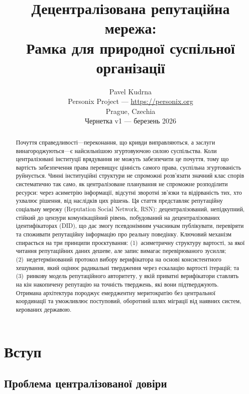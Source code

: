 \documentclass[11pt,a4paper,twocolumn]{article}
\title{\textbf{Децентралізована репутаційна мережа:\\Рамка для природної суспільної організації}}
\author{Pavel Kudrna\\Personix Project --- \url{https://personix.org}\\Prague, Czechia\\Чернетка v1 --- березень 2026}
\date{}
\begin{document}
\maketitle

\begin{abstract}
Почуття справедливості---переконання, що кривди виправляються, а заслуги винагороджуються---є найсильнішою згуртовуючою силою суспільства. Коли централізовані інституції врядування не можуть забезпечити це почуття, тому що вартість забезпечення права перевищує цінність самого права, суспільна згуртованість руйнується. Чинні інституційні структури не спроможні розв'язати значний клас спорів систематично так само, як централізоване планування не спроможне розподілити ресурси: через асиметрію інформації, відсутні зворотні зв'язки та відірваність тих, хто ухвалює рішення, від наслідків цих рішень. Ця стаття представляє репутаційну соціальну мережу (Reputation Social Network, RSN): децентралізований, непідкупний, стійкий до цензури комунікаційний рівень, побудований на децентралізованих ідентифікаторах (DID), що дає змогу псевдонімним учасникам публікувати, перевіряти та споживати репутаційну інформацію про реальну поведінку. Ключовий механізм спирається на три принципи проєктування: (1)~асиметричну структуру вартості, за якої читання репутаційних даних дешеве, але запис вимагає перевірюваного зусилля; (2)~недетермінований протокол вибору верифікатора на основі консистентного хешування, який оцінює радикальні твердження через ескалацію вартості ітерацій; та (3)~ринкову модель репутаційного авторитету, у якій приватні верифікатори ставлять на кін накопичену репутацію на точність тверджень, які вони підтверджують. Отримана архітектура породжує емерджентну меритократію без центральної координації та уможливлює поступовий, оборотний шлях міграції від наявних систем, керованих державою.
\end{abstract}

\section{Вступ}

\subsection{Проблема централізованої довіри}
\end{document}
